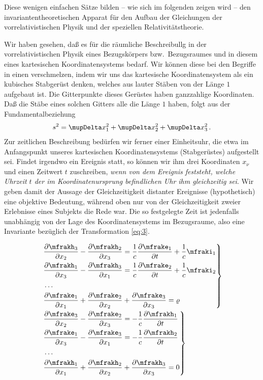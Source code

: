 Diese wenigen einfachen Sätze bilden -- wie sich im folgenden zeigen wird -- 
den invariantentheoretischen Apparat für den Aufbau der Gleichungen der 
vorrelativistischen Physik und der speziellen Relativitätstheorie.

Wir haben gesehen, daß es für die räumliche Beschreibullg in der 
vorrelativistischen Physik eines Bezugskörpers bzw.\ Bezugsraumes und in diesem 
eines kartesischen Koordinatensystems bedarf. Wir können diese bei den Begriffe 
in einen verschmelzen, indem wir uns das kartesische Koordinatensystem als ein 
kubisches Stabgerüst denken, welches aus lauter Stäben von der Länge $1$ 
aufgebaut ist. Die Gitterpunkte dieses Gerüstes haben ganzzahlige Koordinaten. 
Daß die Stäbe eines solchen Gitters alle die Länge $1$ haben, folgt aus der 
Fundamentalbeziehung
\begin{align*}
	s^2 = \Dva x_1^2 + \Dva x_2^2 + \Dva x_3^2\,.
\end{align*}
Zur zeitlichen Beschreibung bedürfen wir ferner einer Einheitsuhr, die etwa im 
Anfangspunkt unseres kartesischen Koordinatensystems (Stabgerüstes) aufgestellt
sei. Findet irgendwo ein Ereignis statt, so können wir ihm drei Koordinaten 
$x_{\nu}$ und einen Zeitwert $t$ zuschreiben, \emph{wenn von dem Ereignis 
feststeht, welche Uhrzeit $t$ der im Koordinatenursprung befindlichen Uhr ihm
gleichzeitig sei}. Wir geben damit der Aussage der Gleichzeitigkeit distanter 
Ereignisse (hypothetisch) eine objektive Bedeutung, während oben nur von der 
Gleichzeitigkeit zweier Erlebnisse eines Subjekts die Rede war. Die so 
festgelegte Zeit ist jedenfalls unabhängig von der Lage des Koordinatensystems 
im Bezugsraume, also eine Invariante bezüglich der Transformation \eqref{eq:3}.


\begin{align}
&\left.
\begin{aligned}
&\frpa{\mfrakh_3}{x_2} - \frpa{\mfrakh_2}{x_3} =
\frac{1}{c} \frpa{\mfrake_1}{t} + \frac{1}{c} \mfraki_1
\\
&\frpa{\mfrakh_1}{x_3} - \frpa{\mfrakh_3}{x_1} =
\frac{1}{c} \frpa{\mfrake_2}{t} + \frac{1}{c} \mfraki_2
\\
&\ldots
\\
&\frpa{\mfrake_1}{x_1} + \frpa{\mfrake_2}{x_2} + \frpa{\mfrake_3}{x_3} = \varrho
\end{aligned}
\right\}
\label{eq:19} \\
&\left.
\begin{aligned}
&\frpa{\mfrake_3}{x_2} - \frpa{\mfrake_2}{x_3} =
-\frac{1}{c} \frpa{\mfrakh_1}{t}
\\
&\frpa{\mfrake_1}{x_3} - \frpa{\mfrake_3}{x_1} =
-\frac{1}{c} \frpa{\mfrakh_2}{t}
\\
&\ldots
\\
&\frpa{\mfrakh_1}{x_1} + \frpa{\mfrakh_2}{x_2} + \frpa{\mfrakh_3}{x_3} = 0
\end{aligned}
\right\}
\label{eq:20}
\end{align}


